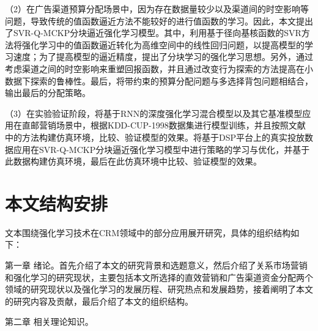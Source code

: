 （2）在广告渠道预算分配场景中，因为存在数据量较少以及渠道间的时空影响等问题，导致传统的值函数逼近方法不能较好的进行值函数的学习。因此，本文提出了SVR-Q-MCKP分块逼近强化学习模型。其中，利用基于径向基核函数的SVR方法将强化学习中的值函数逼近转化为高维空间中的线性回归问题，以提高模型的学习速度；为了提高模型的逼近精度，提出了分块学习的强化学习思想。另外，通过考虑渠道之间的时空影响来重塑回报函数，并且通过改变行为探索的方法提高在小数据下探索的鲁棒性。最后，将带约束的预算分配问题与多选择背包问题相结合，输出最后的分配策略。

 （3）在实验验证阶段，将基于RNN的深度强化学习混合模型以及其它基准模型应用在直邮营销场景中，根据KDD-CUP-1998数据集进行模型训练，并且按照文献\citep{pednault2002sequential}中的方法构建仿真环境，比较、验证模型的效果。将基于DSP平台上的真实投放数据应用在SVR-Q-MCKP分块逼近强化学习模型中进行策略的学习与优化，并基于此数据构建仿真环境，最后在此仿真环境中比较、验证模型的效果。

\section{本文结构安排}
文本围绕强化学习技术在CRM领域中的部分应用展开研究，具体的组织结构如下：

第一章 绪论。首先介绍了本文的研究背景和选题意义，然后介绍了关系市场营销和强化学习的研究现状，主要包括本文所选择的直效营销和广告渠道资金分配两个领域的研究现状以及强化学习的发展历程、研究热点和发展趋势，接着阐明了本文的研究内容及贡献，最后介绍了本文的组织结构。

第二章 相关理论知识。

